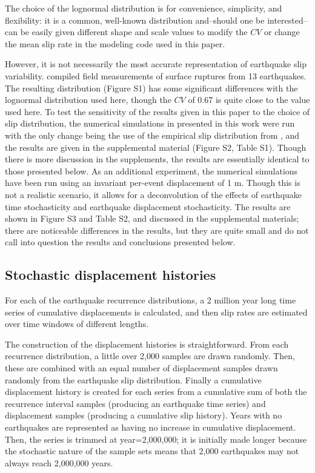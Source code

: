 \documentclass[se, manuscript]{copernicus}
\begin{document}
The choice of the lognormal distribution is for convenience, simplicity, and
flexibility: it is a common, well-known distribution and--should one be
interested--can be easily given different shape and scale values to modify the
\(CV\) or change the mean slip rate in the modeling code used in this paper.

However, it is not necessarily the most accurate representation of earthquake
slip variability. \citet{biasi_estimating_2006} compiled field measurements of
surface ruptures from 13 earthquakes. The resulting distribution (Figure S1) has
some significant differences with the lognormal distribution used here, though
the \(CV\) of 0.67 is quite close to the value used here. To test the
sensitivity of the results given in this paper to the choice of slip
distribution, the numerical simulations in presented in this work were run with
the only change being the use of the empirical slip distribution from 
\citet{biasi_estimating_2006}, and the results are given in the supplemental 
material (Figure S2, Table S1). Though there is more discussion in the 
supplements, the results are essentially identical to those presented below. As 
an additional experiment, the numerical simulations have been run using an 
invariant per-event displacement of 1 m. Though this is not a realistic 
scenario, it allows for a deconvolution of the effects of earthquake time 
stochasticity and earthquake displacement stochasticity. The results are shown 
in Figure S3 and Table S2, and discussed in the supplemental materials; there 
are noticeable differences in the results, but they are quite small and do not 
call into question the results and conclusions presented below.



\subsection{Stochastic displacement
histories}\label{stochastic-displacement-histories}

For each of the earthquake recurrence distributions, a 2 million year
long time series of cumulative displacements is calculated, and then
slip rates are estimated over time windows of different lengths.

The construction of the displacement histories is straightforward. From
each recurrence distribution, a little over 2,000 samples are drawn
randomly. Then, these are combined with an equal number of displacement
samples drawn randomly from the earthquake slip distribution. Finally a
cumulative displacement history is created for each series from a
cumulative sum of both the recurrence interval samples (producing an
earthquake time series) and displacement samples (producing a cumulative
slip history). Years with no earthquakes are represented as having no
increase in cumulative displacement. Then, the series is trimmed at
year=2,000,000; it is initially made longer because the stochastic
nature of the sample sets means that 2,000 earthquakes may not always
reach 2,000,000 years.
\end{document}
